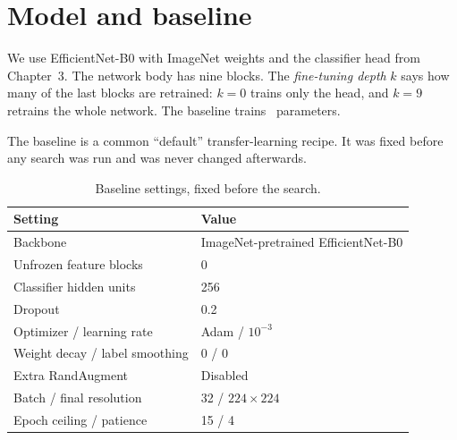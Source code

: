 \section{Model and baseline}
We use EfficientNet-B0 with ImageNet weights and the classifier head from Chapter~3. The network body has nine blocks. The \emph{fine-tuning depth} $k$ says how many of the last blocks are retrained: $k=0$ trains only the head, and $k=9$ retrains the whole network. The baseline trains \BaselineParams\ parameters.



The baseline is a common ``default'' transfer-learning recipe. It was fixed before any search was run and was never changed afterwards.
\begin{table}[htbp]\centering\small
\caption{Baseline settings, fixed before the search.}
\begin{tabular}{ll}\toprule
Setting & Value\\\midrule
Backbone & ImageNet-pretrained EfficientNet-B0\\
Unfrozen feature blocks & 0\\
Classifier hidden units & 256\\
Dropout & 0.2\\
Optimizer / learning rate & Adam / $10^{-3}$\\
Weight decay / label smoothing & 0 / 0\\
Extra RandAugment & Disabled\\
Batch / final resolution & 32 / $224\times224$\\
Epoch ceiling / patience & 15 / 4\\\bottomrule
\end{tabular}
\end{table}


